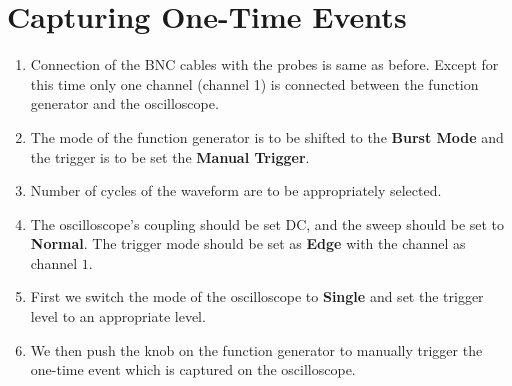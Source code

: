 \documentclass[12pt]{article}
\begin{document}
\section{Capturing One-Time Events}
\begin{enumerate}
    \item Connection of the BNC cables with the probes is same as before. Except for this time only one channel (channel 1) is connected between the function generator and the oscilloscope.
    \item The mode of the function generator is to be shifted to the \textbf{Burst Mode} and the trigger is to be set the \textbf{Manual Trigger}.
    \item Number of cycles of the waveform are to be appropriately selected.
    \item The oscilloscope's coupling should be set DC, and the sweep should be set to \textbf{Normal}. The trigger mode should be set as \textbf{Edge} with the channel as channel $1$.
    \item First we switch the mode of the oscilloscope to \textbf{Single} and set the trigger level to an appropriate level.
    \item We then push the knob on the function generator to manually trigger the one-time event which is captured on the oscilloscope.
\end{enumerate}
\end{document}
